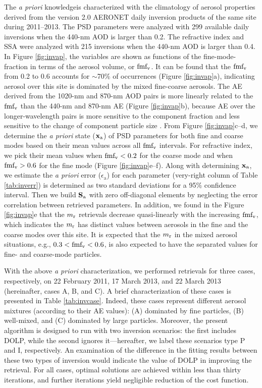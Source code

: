 The \textit{a priori} knowledgeis characterized 
with the climatology of aerosol properties
derived from the version 2.0 AERONET daily inversion products of the same site
during 2011--2013. The PSD parameters were analyzed with 299 available daily
inversions when the 440-nm AOD is larger than 0.2. The refractive index and SSA
were analyzed with 215 inversions when the 440-nm AOD is larger than 0.4. In
Figure \ref{fig:invap}, the variables are shown as functions of the 
fine-mode-fraction in terms of the aerosol volume, or $\text{fmf}_\text{v}$. It can be found 
that the $\text{fmf}_\text{v}$ from 0.2 to 0.6 accounts for $\sim$70\% of occurrences (Figure
\ref{fig:invap}a), indicating aerosol over this site is dominated by the mixed 
fine-coarse aerosols. The AE derived from the 1020-nm and 870-nm AOD pairs is 
more linearly related to the $\text{fmf}_\text{v}$ than the 440-nm and 870-nm AE (Figure
\ref{fig:invap}b), because AE over the longer-wavelength pairs is more
sensitive to the component fraction and less sensitive to the change of
component particle size \citep{Schuster06}. From Figure \ref{fig:invap}c--d, 
we determine the \textit{a priori} state ($\mathbf{x}_\text{a}$) of PSD parameters for
both fine and coarse modes based on their mean values across all $\text{fmf}_\text{v}$
intervals. For refractive index, we pick their mean values when $\text{fmf}_\text{v}<0.2$ 
for the coarse mode and when $\text{fmf}_\text{v}>0.6$ for the fine mode (Figure
\ref{fig:invap}e--f). 
Along with determining $\mathbf{x}_\text{a}$, we estimate the \textit{a priori} error
($\epsilon_\text{a}$) for each parameter (very-right column of Table
\ref{tab:inverr}) is determined as two standard deviations for a 
95\% confidence interval. Then we build $\mathbf{S}_\text{a}$ with zero off-diagonal 
elements by neglecting the error correlation between retrieved parameters. 
In addition, we found in the Figure \ref{fig:invap}e that the $m_\text{r}$ 
retrievals decrease quasi-linearly with the increasing $\text{fmf}_\text{v}$, which indicates
the $m_\text{r}$ has distinct values between aerosols in the fine and the coarse
modes over this site. It is expected that the $m_\text{r}$ in the mixed aerosol
situations, e.g., $0.3<\text{fmf}_\text{v}<0.6$, is also expected to have the separated 
values for fine- and coarse-mode particles.

With the above \textit{a priori} characterization, we performed retrievals for three
cases, respectively, on 22 February 2011, 17 March 2013, and 22 March 2013
(hereinafter, cases A, B, and C). A brief characterization of these cases is
presented in Table \ref{tab:invcase}. Indeed, these cases represent different 
aerosol mixtures (according to their AE values): (A) dominated by 
fine particles, (B) well-mixed, and (C) dominated by large particles. 
Moreover, the present algorithm is designed to run with two inversion 
scenarios: the first includes DOLP, while the second ignores
it---hereafter, we label these scenarios type P and I, respectively. An
examination of the difference in the fitting results between these two types of
inversion would indicate the value of DOLP in improving the retrieval. For all
cases, optimal solutions are achieved within less than thirty iterations, and
further iterations yield negligible reduction of the cost function. 

